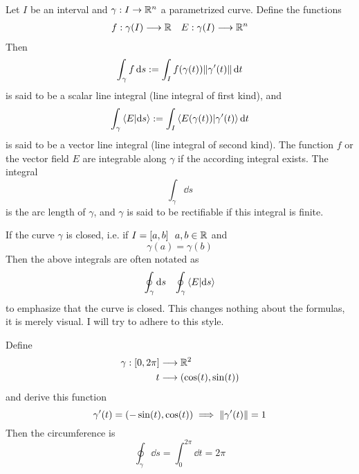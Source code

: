 \documentclass[../../script.tex]{subfiles}
\begin{document}
\begin{defi}
    Let $I$ be an interval and $\gamma: I \rightarrow \mathbb{R}^n$ a parametrized curve. Define the functions
    \begin{align*}
        f: \gamma(I) \longrightarrow \mathbb{R} && E: \gamma(I) \longrightarrow \mathbb{R}^n
    \end{align*}
    Then 
    \[
        \int_{\gamma} f \dd{s} := \int_I f(\gamma(t)) \norm{\gamma'(t)} \dd{t}
    \]
    is said to be a scalar line integral (line integral of first kind), and 
    \[
        \int_{\gamma} \innerproduct{E}{\dd{s}} := \int_I \innerproduct{E(\gamma(t))}{\gamma'(t)} \dd{t}
    \]
    is said to be a vector line integral (line integral of second kind).
    The function $f$ or the vector field $E$ are integrable along $\gamma$ if the according integral exists.
    The integral 
    \[
        \int_{\gamma} \dd{s}
    \]
    is the arc length of $\gamma$, and $\gamma$ is said to be rectifiable if this integral is finite.

    If the curve $\gamma$ is closed, i.e. if $I = [a, b] ~~a, b \in \mathbb{R}$ and 
    \[
        \gamma(a) = \gamma(b)
    \]
    Then the above integrals are often notated as 
    \begin{align*}
        \oint_{\gamma} \dd{s} && \oint_{\gamma} \innerproduct{E}{\dd{s}}
    \end{align*}
    to emphasize that the curve is closed. This changes nothing about the formulas, it is merely visual.
    I will try to adhere to this style.
\end{defi}

\begin{eg}
    Define 
    \begin{align*}
        \gamma: [0, 2\pi] &\longrightarrow \mathbb{R}^2 \\
        t &\longrightarrow (\cos(t), \sin(t))
    \end{align*}
    and derive this function 
    \[
        \gamma'(t) = (-\sin(t), \cos(t)) \implies \norm{\gamma'(t)} = 1
    \]
    Then the circumference is 
    \[
        \oint_{\gamma} \dd{s} = \int_0^{2\pi} \dd{t} = 2\pi
    \]
\end{eg}
\end{document}
